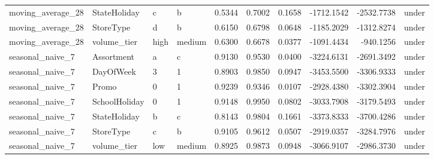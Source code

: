 \begin{table}
\begin{tabular}{llllrrrrrl}
moving\_average\_28 & StateHoliday & c & b & 0.5344 & 0.7002 & 0.1658 & -1712.1542 & -2532.7738 & under \\
moving\_average\_28 & StoreType & d & b & 0.6150 & 0.6798 & 0.0648 & -1185.2029 & -1312.8274 & under \\
moving\_average\_28 & volume\_tier & high & medium & 0.6300 & 0.6678 & 0.0377 & -1091.4434 & -940.1256 & under \\
seasonal\_naive\_7 & Assortment & a & c & 0.9130 & 0.9530 & 0.0400 & -3224.6131 & -2691.3492 & under \\
seasonal\_naive\_7 & DayOfWeek & 3 & 1 & 0.8903 & 0.9850 & 0.0947 & -3453.5500 & -3306.9333 & under \\
seasonal\_naive\_7 & Promo & 0 & 1 & 0.9239 & 0.9346 & 0.0107 & -2928.4380 & -3302.3904 & under \\
seasonal\_naive\_7 & SchoolHoliday & 0 & 1 & 0.9148 & 0.9950 & 0.0802 & -3033.7908 & -3179.5493 & under \\
seasonal\_naive\_7 & StateHoliday & b & c & 0.8143 & 0.9804 & 0.1661 & -3373.8333 & -3700.4286 & under \\
seasonal\_naive\_7 & StoreType & c & b & 0.9105 & 0.9612 & 0.0507 & -2919.0357 & -3284.7976 & under \\
seasonal\_naive\_7 & volume\_tier & low & medium & 0.8925 & 0.9873 & 0.0948 & -3066.9107 & -2986.3730 & under \\
\bottomrule
\end{tabular}
\end{table}
